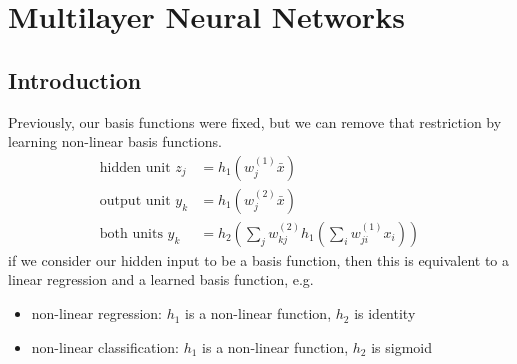 \documentclass[]{article}
\theoremstyle{definition}
\begin{document}
    \section{Multilayer Neural Networks}
    \label{sec:multilayer_neural_networks}
    
    \subsection{Introduction}
    Previously, our basis functions were fixed, but we can remove that restriction by learning non-linear basis functions.
    \begin{align*}
        \label{eq:}
        \text{hidden unit } z_j &= h_1 (w_j^{(1)} \bar x) \\
        \text{output unit } y_k &= h_1 (w_j^{(2)} \bar x)  \\
        \text{both units } y_k &= h_2(\sum_j w_{kj}^{(2)} h_1 (\sum_i w_{ji}^{(1)} x_i))
    \end{align*}
    if we consider our hidden input to be a basis function, then this is equivalent to a linear regression and a learned basis function, e.g.
    \begin{itemize}
        \item non-linear regression: $h_1$ is a non-linear function, $h_2$ is identity
        \item non-linear classification: $h_1$ is a non-linear function, $h_2$ is sigmoid
    \end{itemize}
\end{document}
